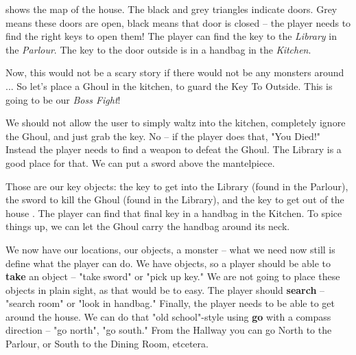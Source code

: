  shows the map of the house. The black and grey triangles indicate doors. Grey means these doors are open, black means that door is closed -- the player needs to find the right keys to open them! The player can find the key to the \emph{Library} in the \emph{Parlour}. The key to the door outside is in a handbag in the \emph{Kitchen}. 

Now, this would not be a scary story if there would not be any monsters around ... So let's place a Ghoul in the kitchen, to guard the Key To Outside. This is going to be our \emph{Boss Fight}! 

We should not allow the user to simply waltz into the kitchen, completely ignore the Ghoul, and just grab the key. No -- if the player does that, "You Died!" Instead the player needs to find a weapon to defeat the Ghoul. The Library is a good place for that. We can put a sword above the mantelpiece. 

Those are our key objects: the key to get into the Library (found in the Parlour), the sword to kill the Ghoul (found in the Library), and the key to get out of the house . The player can find that final key in a handbag in the Kitchen. To spice things up, we can let the Ghoul carry the handbag around its neck.  

We now have our locations, our objects, a monster -- what we need now still is define what the player can do. We have objects, so a player should be able to \textbf{take} an object -- "take sword" or "pick up key." We are not going to place these objects in plain sight, as that would be to easy. The player should \textbf{search} -- "search room" or "look in handbag." Finally, the player needs to be able to get around the house. We can do that "old school"-style using \textbf{go} with a compass direction -- "go north", "go south." From the Hallway you can go North to the Parlour, or South to the Dining Room, etcetera.

 

      


 



  